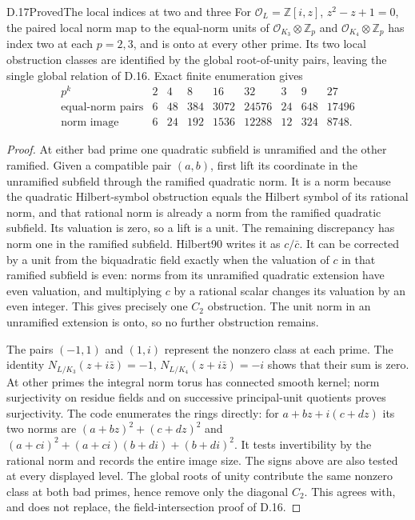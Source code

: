 \begin{statement}{D.17}{Proved}{The local indices at two and three}
For $\mathcal O_L=\mathbb Z[i,z]$, $z^2-z+1=0$, the paired local norm map to the equal-norm units of $\mathcal O_{K_3}\otimes\mathbb Z_p$ and $\mathcal O_{K_4}\otimes\mathbb Z_p$ has index two at each $p=2,3$, and is onto at every other prime. Its two local obstruction classes are identified by the global root-of-unity pairs, leaving the single global relation of D.16. Exact finite enumeration gives
\[
\begin{array}{c|rrrrrrrr}
 p^k&2&4&8&16&32&3&9&27\\\hline
 \text{equal-norm pairs}&6&48&384&3072&24576&24&648&17496\\
 \text{norm image}&6&24&192&1536&12288&12&324&8748.
\end{array}                                               \tag{D.15}
\]
\end{statement}
\begin{proof}
At either bad prime one quadratic subfield is unramified and the other ramified. Given a compatible pair $(a,b)$, first lift its coordinate in the unramified subfield through the ramified quadratic norm. It is a norm because the quadratic Hilbert-symbol obstruction equals the Hilbert symbol of its rational norm, and that rational norm is already a norm from the ramified quadratic subfield. Its valuation is zero, so a lift is a unit. The remaining discrepancy has norm one in the ramified subfield. Hilbert90 writes it as $c/\bar c$. It can be corrected by a unit from the biquadratic field exactly when the valuation of $c$ in that ramified subfield is even: norms from its unramified quadratic extension have even valuation, and multiplying $c$ by a rational scalar changes its valuation by an even integer. This gives precisely one $C_2$ obstruction. The unit norm in an unramified extension is onto, so no further obstruction remains.

The pairs $(-1,1)$ and $(1,i)$ represent the nonzero class at each prime. The identity
$N_{L/K_3}(z+i\bar z)=-1$, $N_{L/K_4}(z+i\bar z)=-i$
shows that their sum is zero. At other primes the integral norm torus has connected smooth kernel; norm surjectivity on residue fields and on successive principal-unit quotients proves surjectivity. The code enumerates the rings directly: for $a+bz+i(c+dz)$ its two norms are
$(a+bz)^2+(c+dz)^2$ and
$(a+ci)^2+(a+ci)(b+di)+(b+di)^2$.
It tests invertibility by the rational norm and records the entire image size. The signs above are also tested at every displayed level. The global roots of unity contribute the same nonzero class at both bad primes, hence remove only the diagonal $C_2$. This agrees with, and does not replace, the field-intersection proof of D.16.
\end{proof}

